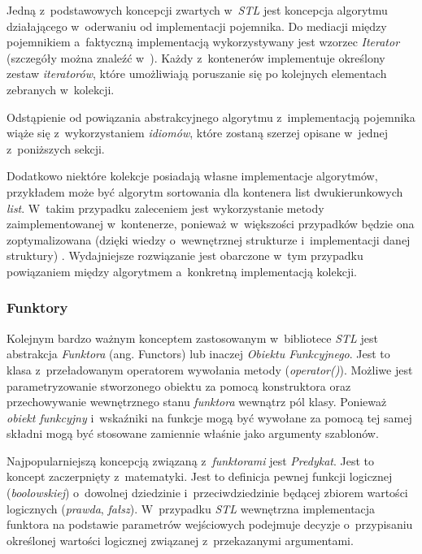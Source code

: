         Jedną z~podstawowych koncepcji zwartych w~\textit{STL} jest koncepcja algorytmu działającego w~oderwaniu od implementacji pojemnika. Do mediacji między pojemnikiem a~faktyczną implementacją wykorzystywany jest wzorzec \textit{Iterator} (szczegóły można znaleźć w~\cite{PatternsGoF}). Każdy z~kontenerów implementuje określony zestaw \textit{iteratorów}, które umożliwiają poruszanie się po kolejnych elementach zebranych w~kolekcji.

        Odstąpienie od powiązania abstrakcyjnego algorytmu z~implementacją pojemnika wiąże się z~wykorzystaniem \textit{idiomów}, które zostaną szerzej opisane w~jednej z~poniższych sekcji.

        Dodatkowo niektóre kolekcje posiadają własne implementacje algorytmów, przykładem może być algorytm sortowania dla kontenera list dwukierunkowych \textit{list}. W~takim przypadku zaleceniem jest wykorzystanie metody zaimplementowanej w~kontenerze, ponieważ w~większości przypadków będzie ona zoptymalizowana (dzięki wiedzy o~wewnętrznej strukturze i~implementacji danej struktury) \cite{EffectiveStl}. Wydajniejsze rozwiązanie jest obarczone w~tym przypadku powiązaniem między algorytmem a~konkretną implementacją kolekcji.

      \subsubsection{Funktory}

        Kolejnym bardzo ważnym konceptem zastosowanym w~bibliotece \textit{STL} jest abstrakcja \textit{Funktora} (ang. Functors) lub inaczej \textit{Obiektu Funkcyjnego}. Jest to klasa z~przeładowanym operatorem wywołania metody (\textit{operator()}). Możliwe jest parametryzowanie stworzonego obiektu za pomocą konstruktora oraz przechowywanie wewnętrznego stanu \textit{funktora} wewnątrz pól klasy. Ponieważ \textit{obiekt funkcyjny} i~wskaźniki na funkcje mogą być wywołane za pomocą tej samej składni mogą być stosowane zamiennie właśnie jako argumenty szablonów.

        Najpopularniejszą koncepcją związaną z~\textit{funktorami} jest \textit{Predykat}. Jest to koncept zaczerpnięty z~matematyki. Jest to definicja pewnej funkcji logicznej (\textit{boolowskiej}) o~dowolnej dziedzinie i~przeciwdziedzinie będącej zbiorem wartości logicznych (\textit{prawda}, \textit{fałsz}). W~przypadku \textit{STL} wewnętrzna implementacja funktora na podstawie parametrów wejściowych podejmuje decyzje o~przypisaniu określonej wartości logicznej związanej z~przekazanymi argumentami.

